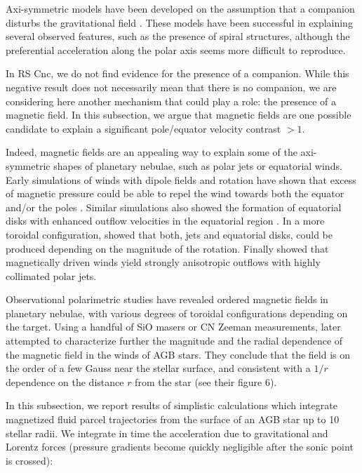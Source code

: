 \documentclass{aa}
\begin{document}
Axi-symmetric models have been developed on the assumption that a
companion disturbs the gravitational field
\citep{tj93,mm99,dmrgh2020}.  These models have been successful in
explaining several observed features, such as the presence of spiral
structures, although the preferential acceleration along the polar
axis seems more difficult to reproduce.

In RS Cnc, we do not find evidence for the presence of a
companion. While this negative result does not necessarily mean that
there is no companion, we are considering here another mechanism that
could play a role: the presence of a magnetic field. In this
subsection, we argue that magnetic fields are one possible candidate
to explain a significant pole/equator velocity contrast $> 1$.

Indeed, magnetic fields are an appealing way to explain some of the
axi-symmetric shapes of planetary nebulae, such as polar jets or
equatorial winds.  Early simulations of winds with dipole fields and
rotation have shown that excess of magnetic pressure could be able to
repel the wind towards both the equator and/or the poles
\citep{1993MNRAS.262..936W}. Similar simulations also showed the
formation of equatorial disks with enhanced outflow velocities in the
equatorial region \citep{mbwg2000}. In a more toroidal configuration,
\citet{2004ApJ...615..921M} showed that both, jets and equatorial
disks,  could be produced depending on the magnitude of the
rotation. Finally \citet{2005ApJ...618..919G} showed that magnetically
driven winds yield strongly anisotropic outflows with highly
collimated polar jets.

Observational polarimetric studies \citep{2002A&A...392L...1G} have
revealed ordered magnetic fields in planetary nebulae, with various
degrees of toroidal configurations depending on the target.  Using a
handful of SiO masers \citep{2006A&A...450..667H} or CN Zeeman
measurements, \citet{dhwbetal2017} later attempted to characterize
further the magnitude and the radial dependence of the magnetic field
in the winds of AGB stars. They conclude that the field is on the
order of a few Gauss near the stellar surface, and consistent with a
$1/r$ dependence on the distance $r$ from the star (see their figure
6).

In this subsection, we report results of simplistic calculations which
integrate magnetized fluid parcel trajectories from the surface of an
AGB star up to 10 stellar radii. We integrate in time the acceleration
due to gravitational and Lorentz forces (pressure gradients become
quickly negligible after the sonic point is crossed):
\end{document}
